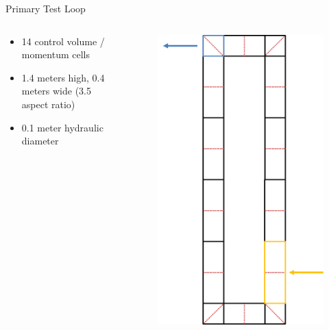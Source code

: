 \documentclass[10pt,t,xcolor=table,compress]{UWMadBeamer}
\begin{document}
    \begin{frame}{Primary Test Loop}
        \begin{columns}
            \begin{column}[T]{0.45\textwidth}
                \begin{itemize}
                    \item 14 control volume / momentum cells
                    \item 1.4 meters high, 0.4 meters wide (3.5 aspect ratio)
                    \item 0.1 meter hydraulic diameter
                \end{itemize}
            \end{column}
            \hfill
            \begin{column}[T]{0.45\textwidth}
                \begin{figure}%
                    \centering
                    \includegraphics[scale=0.36]{TestLoop}%
                \end{figure}
            \end{column}
        \end{columns}
    \end{frame}
\end{document}
